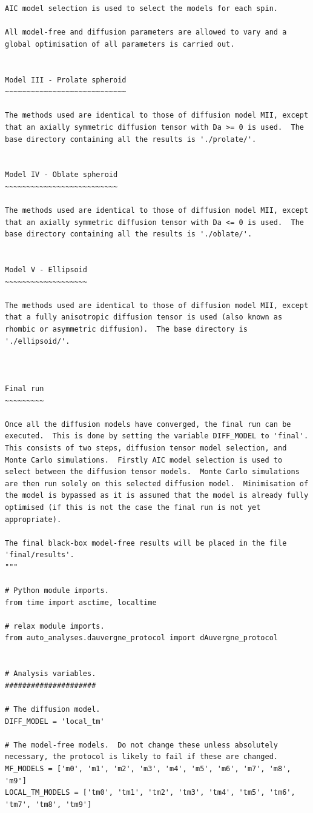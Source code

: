 \begin{htmlonly}
\begin{htmlonly}
\begin{lstlisting}
AIC model selection is used to select the models for each spin.

All model-free and diffusion parameters are allowed to vary and a global optimisation of all parameters is carried out.


Model III - Prolate spheroid
~~~~~~~~~~~~~~~~~~~~~~~~~~~~

The methods used are identical to those of diffusion model MII, except that an axially symmetric diffusion tensor with Da >= 0 is used.  The base directory containing all the results is './prolate/'.


Model IV - Oblate spheroid
~~~~~~~~~~~~~~~~~~~~~~~~~~

The methods used are identical to those of diffusion model MII, except that an axially symmetric diffusion tensor with Da <= 0 is used.  The base directory containing all the results is './oblate/'.


Model V - Ellipsoid
~~~~~~~~~~~~~~~~~~~

The methods used are identical to those of diffusion model MII, except that a fully anisotropic diffusion tensor is used (also known as rhombic or asymmetric diffusion).  The base directory is './ellipsoid/'.



Final run
~~~~~~~~~

Once all the diffusion models have converged, the final run can be executed.  This is done by setting the variable DIFF_MODEL to 'final'.  This consists of two steps, diffusion tensor model selection, and Monte Carlo simulations.  Firstly AIC model selection is used to select between the diffusion tensor models.  Monte Carlo simulations are then run solely on this selected diffusion model.  Minimisation of the model is bypassed as it is assumed that the model is already fully optimised (if this is not the case the final run is not yet appropriate).

The final black-box model-free results will be placed in the file 'final/results'.
"""

# Python module imports.
from time import asctime, localtime

# relax module imports.
from auto_analyses.dauvergne_protocol import dAuvergne_protocol


# Analysis variables.
#####################

# The diffusion model.
DIFF_MODEL = 'local_tm'

# The model-free models.  Do not change these unless absolutely necessary, the protocol is likely to fail if these are changed.
MF_MODELS = ['m0', 'm1', 'm2', 'm3', 'm4', 'm5', 'm6', 'm7', 'm8', 'm9']
LOCAL_TM_MODELS = ['tm0', 'tm1', 'tm2', 'tm3', 'tm4', 'tm5', 'tm6', 'tm7', 'tm8', 'tm9']


\end{lstlisting}
\end{htmlonly}
\end{htmlonly}
